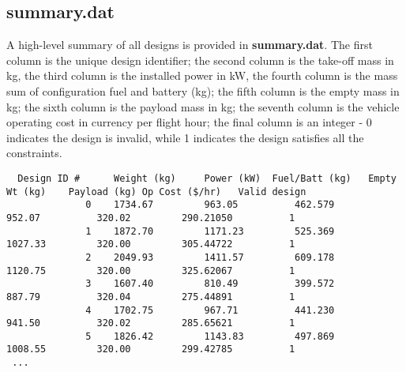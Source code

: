 \begin{landscape}
\subsection{\textbf{summary.dat}}
A high-level summary of all designs is provided in \textbf{summary.dat}. The first column is the unique design identifier; the second column is the take-off mass in kg, the third column is the installed power in kW, the fourth column is the mass sum of configuration fuel and battery (kg); the fifth column is the empty mass in kg; the sixth column is the payload mass in kg; the seventh column is the vehicle operating cost in currency per flight hour; the final column is an integer - 0 indicates the design is invalid, while 1 indicates the design satisfies all the constraints.
\begin{lstlisting}
  Design ID #      Weight (kg)     Power (kW)  Fuel/Batt (kg)   Empty Wt (kg)    Payload (kg) Op Cost ($/hr)   Valid design  
              0    1734.67         963.05          462.579        952.07          320.02         290.21050          1       
              1    1872.70         1171.23         525.369        1027.33         320.00         305.44722          1       
              2    2049.93         1411.57         609.178        1120.75         320.00         325.62067          1       
              3    1607.40         810.49          399.572        887.79          320.04         275.44891          1       
              4    1702.75         967.71          441.230        941.50          320.02         285.65621          1       
              5    1826.42         1143.83         497.869        1008.55         320.00         299.42785          1       
 ... 
\end{lstlisting}
\end{landscape}
